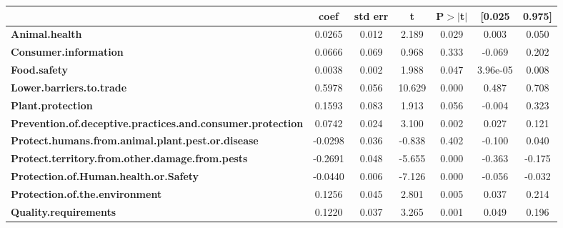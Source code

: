 \begin{center}
\begin{tabular}{lcccccc}
                                                                   & \textbf{coef} & \textbf{std err} & \textbf{t} & \textbf{P$> |$t$|$} & \textbf{[0.025} & \textbf{0.975]}  \\
\midrule
\textbf{Animal.health}                                             &       0.0265  &        0.012     &     2.189  &         0.029        &        0.003    &        0.050     \\
\textbf{Consumer.information}                                      &       0.0666  &        0.069     &     0.968  &         0.333        &       -0.069    &        0.202     \\
\textbf{Food.safety}                                               &       0.0038  &        0.002     &     1.988  &         0.047        &     3.96e-05    &        0.008     \\
\textbf{Lower.barriers.to.trade}                                   &       0.5978  &        0.056     &    10.629  &         0.000        &        0.487    &        0.708     \\
\textbf{Plant.protection}                                          &       0.1593  &        0.083     &     1.913  &         0.056        &       -0.004    &        0.323     \\
\textbf{Prevention.of.deceptive.practices.and.consumer.protection} &       0.0742  &        0.024     &     3.100  &         0.002        &        0.027    &        0.121     \\
\textbf{Protect.humans.from.animal.plant.pest.or.disease}          &      -0.0298  &        0.036     &    -0.838  &         0.402        &       -0.100    &        0.040     \\
\textbf{Protect.territory.from.other.damage.from.pests}            &      -0.2691  &        0.048     &    -5.655  &         0.000        &       -0.363    &       -0.175     \\
\textbf{Protection.of.Human.health.or.Safety}                      &      -0.0440  &        0.006     &    -7.126  &         0.000        &       -0.056    &       -0.032     \\
\textbf{Protection.of.the.environment}                             &       0.1256  &        0.045     &     2.801  &         0.005        &        0.037    &        0.214     \\
\textbf{Quality.requirements}                                      &       0.1220  &        0.037     &     3.265  &         0.001        &        0.049    &        0.196     \\

\end{tabular}
\end{center}

